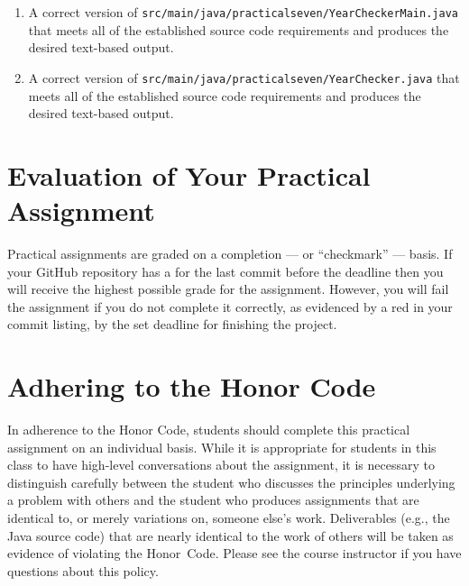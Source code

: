 \documentclass[11pt]{article}
\newcommand{\mainprogramsource}{\lstinline{src/main/java/practicalseven/YearCheckerMain.java}}
\newcommand{\secondprogramsource}{\lstinline{src/main/java/practicalseven/YearChecker.java}}
\newcommand{\checkmark}{\ding{51}}
\newcommand{\naughtmark}{\ding{55}}
\begin{document}
\begin{enumerate}

\setlength{\itemsep}{0in}

\item A correct version of \mainprogramsource{} that meets all of the established source code requirements and produces
  the desired text-based output.

\item A correct version of \secondprogramsource{} that meets all of the established source code requirements and
  produces the desired text-based output.

\end{enumerate}

\section*{Evaluation of Your Practical Assignment}

Practical assignments are graded on a completion --- or ``checkmark'' --- basis.
If your GitHub repository has a \checkmark{} for the last commit before the
deadline then you will receive the highest possible grade for the assignment.
However, you will fail the assignment if you do not complete it correctly, as
evidenced by a red \naughtmark{} in your commit listing, by the set deadline for
finishing the project.

\section*{Adhering to the Honor Code}

In adherence to the Honor Code, students should complete this practical
assignment on an individual basis. While it is appropriate for students in this
class to have high-level conversations about the assignment, it is necessary to
distinguish carefully between the student who discusses the principles
underlying a problem with others and the student who produces assignments that
are identical to, or merely variations on, someone else's work. Deliverables
(e.g., the Java source code) that are nearly identical to the work of others
will be taken as evidence of violating the \mbox{Honor Code}. Please see the
course instructor if you have questions about this policy.
\end{document}

